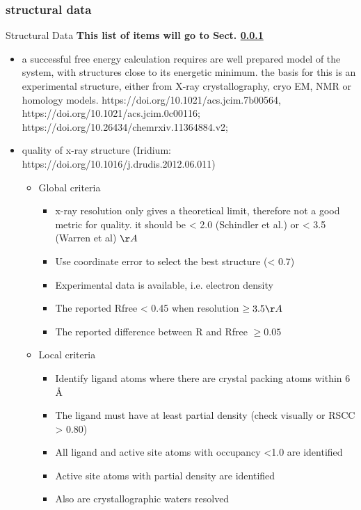 \documentclass[9pt,bestpractices]{livecoms}
\begin{document}
\subsubsection{structural data}
\label{sec:struct_data}
\begin{Checklists*}[p!]

\begin{checklist}{Structural Data}
\textbf{This list of items will go to Sect. \ref{sec:struct_data}}
\begin{itemize}
\item a successful free energy calculation requires are well prepared model of the system, with structures close to its energetic minimum. the basis for this is an experimental structure, either from X-ray crystallography, cryo EM, NMR or homology models. https://doi.org/10.1021/acs.jcim.7b00564, https://doi.org/10.1021/acs.jcim.0c00116; https://doi.org/10.26434/chemrxiv.11364884.v2; 
\item quality of x-ray structure  (Iridium: https://doi.org/10.1016/j.drudis.2012.06.011)
    \begin{itemize}
    \item Global criteria
        \begin{itemize}
        \item x-ray resolution only gives a theoretical limit, therefore not a good metric for quality. it should be < 2.0 (Schindler et al.) or < 3.5 (Warren et al) $\AA$
        \item Use coordinate error to select the best structure (< 0.7)
        \item Experimental data is available, i.e. electron density
        \item The reported Rfree < 0.45 when resolution $\ge 3.5 \AA$
        \item The reported difference between R and Rfree $\ge 0.05$
        \end{itemize}
    \item Local criteria
        \begin{itemize}
        \item Identify ligand atoms where there are crystal packing atoms within 6 Å
        \item The ligand must have at least partial density (check visually or RSCC > 0.80)
        \item All ligand and active site atoms with occupancy <1.0 are identified
        \item Active site atoms with partial density are identified
        \item Also are crystallographic waters resolved

\end{itemize}
\end{itemize}
\end{itemize}
\end{checklist}
\end{Checklists*}
\end{document}
